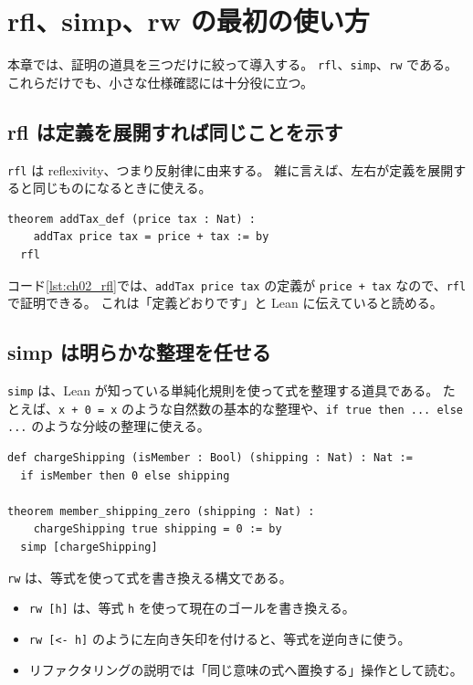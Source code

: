\section{rfl、simp、rw の最初の使い方}

本章では、証明の道具を三つだけに絞って導入する。
\texttt{rfl}、\texttt{simp}、\texttt{rw} である。
これらだけでも、小さな仕様確認には十分役に立つ。

\subsection{rfl は定義を展開すれば同じことを示す}

\texttt{rfl} は reflexivity、つまり反射律に由来する。
雑に言えば、左右が定義を展開すると同じものになるときに使える。

\begin{listing}[htbp]
\begin{verbatim}
theorem addTax_def (price tax : Nat) :
    addTax price tax = price + tax := by
  rfl
\end{verbatim}
\caption{rfl で定義どおりの等式を証明する}
\label{lst:ch02_rfl}
\end{listing}

コード\ref{lst:ch02_rfl}では、\texttt{addTax price tax} の定義が \texttt{price + tax} なので、\texttt{rfl} で証明できる。
これは「定義どおりです」と Lean に伝えていると読める。

\subsection{simp は明らかな整理を任せる}

\texttt{simp} は、Lean が知っている単純化規則を使って式を整理する道具である。
たとえば、\texttt{x + 0 = x} のような自然数の基本的な整理や、\texttt{if true then ... else ...} のような分岐の整理に使える。

\begin{listing}[htbp]
\begin{verbatim}
def chargeShipping (isMember : Bool) (shipping : Nat) : Nat :=
  if isMember then 0 else shipping

theorem member_shipping_zero (shipping : Nat) :
    chargeShipping true shipping = 0 := by
  simp [chargeShipping]
\end{verbatim}
\caption{simp で分岐を整理する}
\label{lst:ch02_simp}
\end{listing}

\begin{syntaxbox}
\texttt{rw} は、等式を使って式を書き換える構文である。
\begin{itemize}
\item \texttt{rw [h]} は、等式 \texttt{h} を使って現在のゴールを書き換える。
\item \texttt{rw [<- h]} のように左向き矢印を付けると、等式を逆向きに使う。
\item リファクタリングの説明では「同じ意味の式へ置換する」操作として読む。
\end{itemize}
\end{syntaxbox}


